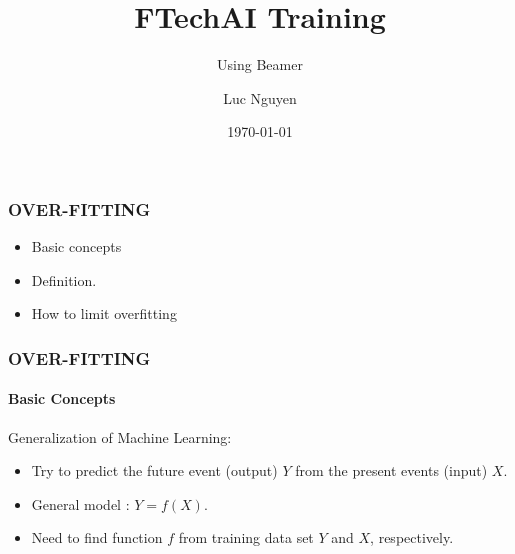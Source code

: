 \documentclass[11pt]{beamer}
\title{FTechAI Training}
\subtitle{Using Beamer}
\author{Luc Nguyen}
\institute{HUST}
\date{\today}
\begin{document}
\begin{frame}
	\frametitle{\textbf{OVER-FITTING}}
	\begin{itemize}
		\item Basic concepts
		\item Definition.%
		\item How to limit overfitting
	\end{itemize}
\end{frame}
\begin{frame}
	\frametitle{\textbf{OVER-FITTING}}
	\framesubtitle{Basic Concepts}
	\Large{Generalization of Machine Learning:}
	\begin{itemize}
		\item Try to predict the future event (output) $Y$ from the present events (input) $X$.
		\item General model :  $Y = f(X)$.
		\item Need to find function $f$ from training data set $Y$ and $X$, respectively.
	\end{itemize}
\end{frame}
\end{document}
